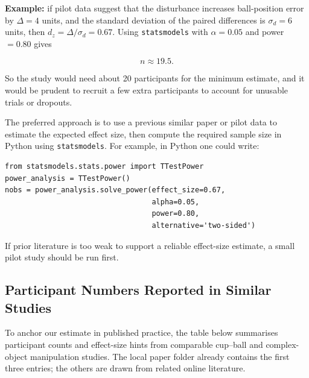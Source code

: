 \documentclass[11pt, a4paper]{article}
\begin{document}
\textbf{Example:} if pilot data suggest that the disturbance increases ball-position error by $\Delta = 4$ units, and the standard deviation of the paired differences is $\sigma_d = 6$ units, then $d_z = \Delta / \sigma_d = 0.67$. Using \texttt{statsmodels} with $\alpha = 0.05$ and power $= 0.80$ gives

\begin{equation}
  n \approx 19.5.
\end{equation}

So the study would need about 20 participants for the minimum estimate, and it would be prudent to recruit a few extra participants to account for unusable trials or dropouts.

The preferred approach is to use a previous similar paper or pilot data to estimate the expected effect size, then compute the required sample size in Python using \texttt{statsmodels}. For example, in Python one could write:

\begin{verbatim}
from statsmodels.stats.power import TTestPower
power_analysis = TTestPower()
nobs = power_analysis.solve_power(effect_size=0.67,
                                  alpha=0.05,
                                  power=0.80,
                                  alternative='two-sided')
\end{verbatim}

\begin{warnbox}
If prior literature is too weak to support a reliable effect-size estimate, a small pilot study should be run first.
\end{warnbox}

\subsection{Participant Numbers Reported in Similar Studies}

To anchor our estimate in published practice, the table below summarises participant counts and effect-size hints from comparable cup--ball and complex-object manipulation studies. The local paper folder already contains the first three entries; the others are drawn from related online literature.
\end{document}
